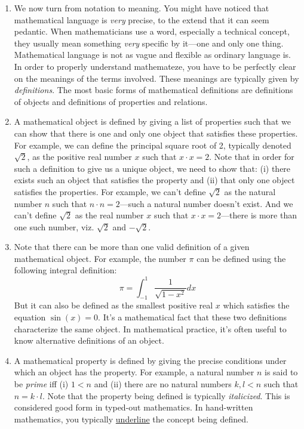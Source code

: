 \begin{enumerate}[{\thesection}.1]
		\item We now turn from notation to meaning. You might have noticed that mathematical language is \emph{very} precise, to the extend that it can seem pedantic. When mathematicians use a word, especially a technical concept, they usually mean something \emph{very} specific by it---one and only one thing. Mathematical language is not as vague and flexible as ordinary language is. In order to properly understand mathemateze, you have to be perfectly clear on the meanings of the terms involved. These meanings are typically given by \emph{definitions}. The most basic forms of mathematical definitions are definitions of objects and definitions of properties and relations.
		
		\item A mathematical object is defined by giving a list of properties such that we can show that there is one and only one object that satisfies these properties. For example, we can define the principal square root of 2, typically denoted $\sqrt{2}$, as the positive real number $x$ such that $x\cdot x=2$. Note that in order for such a definition to give us a unique object, we need to show that: (i) there exists such an object that satisfies the property and (ii) that only one object satisfies the properties. For example, we can't define $\sqrt{2}$ as the natural number $n$ such that $n\cdot n=2$---such a natural number doesn't exist. And we can't define $\sqrt{2}$ as the real number $x$ such that $x\cdot x=2$---there is more than one such number, viz. $\sqrt{2}$ and $-\sqrt{2}$.
		
		\item Note that there can be more than one valid definition of a given mathematical object. For example, the number $\pi$ can be defined using the following integral definition: \[\pi=\int_{-1}^{1}\frac{1}{\sqrt{1-x^2}}dx\] But it can also be defined as the smallest positive real $x$ which satisfies the equation $\sin(x)=0$. It's a mathematical fact that these two definitions characterize the same object. In mathematical practice, it's often useful to know alternative definitions of an object.		
		\item A mathematical property is defined by giving the precise conditions under which an object has the property. For example, a natural number $n$ is said to be \emph{prime} iff (i) $1<n$ and (ii) there are no natural numbers $k,l<n$ such that $n=k\cdot l$. Note that the property being defined is typically \emph{italicized}. This is considered good form in typed-out mathematics. In hand-written mathematics, you typically \underline{underline} the concept being defined.
		

\end{enumerate}
